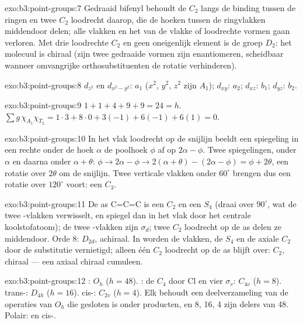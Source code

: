 \begin{solution}{exo:b3:point-groups:7}
Gedraaid bifenyl behoudt de $C_2$ langs de binding tussen de ringen en twee
$C_2$ loodrecht daarop, die de hoeken tussen de ringvlakken middendoor
delen; alle vlakken en het  van de vlakke of loodrechte
vormen gaan verloren. Met drie loodrechte $C_2$ en geen oneigenlijk element
is de groep
$D_2$: het molecuul is chiraal (zijn twee gedraaide vormen zijn
enantiomeren, scheidbaar wanneer omvangrijke orthosubstituenten de rotatie
verhinderen).
\end{solution}

\begin{solution}{exo:b3:point-groups:8}
$d_{z^2}$ en $d_{x^2-y^2}$: $a_1$ ($x^2$, $y^2$, $z^2$ zijn $A_1$); $d_{xy}$: $a_2$; $d_{xz}$:
$b_1$; $d_{yz}$: $b_2$.
\end{solution}

\begin{solution}{exo:b3:point-groups:9}
$1 + 1 + 4 + 9 + 9 = 24 = h$. $\sum g\,\chi_{A_1}\chi_{T_2} = 1\cdot3 + 8\cdot0 + 3(-1)
+ 6(-1) + 6(1) = 0$.
\end{solution}

\begin{solution}{exo:b3:point-groups:10}
In het vlak loodrecht op de snijlijn beeldt een spiegeling in een rechte
onder de hoek $\alpha$ de poolhoek $\phi$ af op $2\alpha - \phi$. Twee
spiegelingen, onder
$\alpha$ en daarna onder $\alpha + \theta$: $\phi \to 2\alpha - \phi \to 2(\alpha + \theta) - (2\alpha - \phi) =
\phi + 2\theta$, een rotatie over $2\theta$ om de snijlijn. Twee verticale
vlakken onder
$60^\circ$ brengen dus een rotatie over $120^\circ$ voort: een $C_3$.
\end{solution}

\begin{solution}{exo:b3:point-groups:11}
De as C=C=C is een $C_2$ en een $S_4$ (draai over $90^\circ$, wat de twee
-vlakken verwisselt, en spiegel dan in het vlak door het centrale
koolstofatoom); de twee
-vlakken zijn $\sigma_d$; twee $C_2$ loodrecht op de as delen ze
middendoor.
Orde 8: $D_{2d}$, achiraal. In  worden de vlakken, de $S_4$
en de axiale
$C_2$ door de substitutie vernietigd; alleen één $C_2$ loodrecht op de
as blijft over: $C_2$, chiraal --- een axiaal chiraal cumuleen.
\end{solution}

\begin{solution}{exo:b3:point-groups:12}
: $O_h$ ($h = 48$). : de $C_4$ door Cl en vier $\sigma_v$:
$C_{4v}$ ($h = 8$). trans-: $D_{4h}$ ($h = 16$). cis-: $C_{2v}$ ($h
= 4$). Elk behoudt een deelverzameling van de operaties van $O_h$ die
gesloten is onder producten,
en 8, 16, 4 zijn delers van 48. Polair:  en cis-.
\end{solution}

